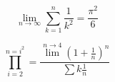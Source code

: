 \documentclass{article}
\begin{document}
$$\lim_{n\to\infty}
\sum_{k=1}^n \frac{1}{k^2}
=\frac{\pi^2}{6}$$


$$\prod_{i=2}^{n=i^{2}} = \frac{\lim^{n\to 4}(1+\frac{1}{n})^{n}}{\sum{k{\frac{1}{n}}}}$$
\end{document}
